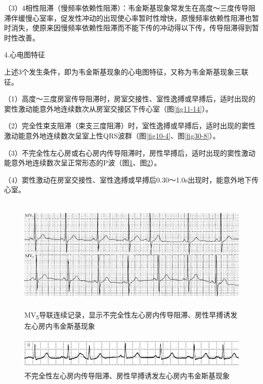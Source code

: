 （3）4相性阻滞（慢频率依赖性阻滞）：韦金斯基现象常发生在高度～三度传导阻滞伴缓慢心室率，促发性冲动的出现使心率暂时性增快，原慢频率依赖性阻滞也暂时消失，使原来因慢频率依赖性阻滞而不能下传的冲动得以下传，传导阻滞得到暂时性改善。

4.心电图特征

上述3个发生条件，即为韦金斯基现象的心电图特征，又称为韦金斯基现象三联征。

（1）高度～三度房室传导阻滞时，房室交接性、室性逸搏或早搏后，适时出现的窦性激动能意外地连续数次从房室交接区下传心室（图\ref{fig11-14}）。

（2）完全性束支阻滞（束支三度阻滞）时，室性逸搏或早搏后，适时出现的窦性激动能意外地连续数次呈室上性QRS波群（图\ref{fig10-4}、图\ref{fig30-8}）。

（3）不完全性左心房或右心房内传导阻滞时，房性早搏后，适时出现的窦性激动能意外地连续数次呈正常形态的P波（图\ref{fig28-3}、图\ref{fig28-4}）。

（4）窦性激动在房室交接性、室性逸搏或早搏后0.30～1.0s出现时，能意外地下传心室。

\begin{figure}[!htbp]
 \centering
 \includegraphics[width=5.58333in,height=2.16667in]{./images/Image00463.jpg}
 \captionsetup{justification=centering}
 \caption{MV\textsubscript{5}导联连续记录，显示不完全性左心房内传导阻滞、房性早搏诱发左心房内韦金斯基现象}
 \label{fig28-3}
  \end{figure} 


\begin{figure}[!htbp]
 \centering
 \includegraphics[width=5.60417in,height=0.625in]{./images/Image00464.jpg}
 \captionsetup{justification=centering}
 \caption{不完全性左心房内传导阻滞、房性早搏诱发左心房内韦金斯基现象}
 \label{fig28-4}
  \end{figure} 


